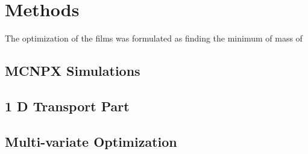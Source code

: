 \section{Methods}
\label{sec:Methodes}


The optimization of the films was formulated as finding the minimum of mass of 
\subsection{MCNPX Simulations}
\label{sec:MCNPXMethods}

\subsection{1 D Transport Part}

\subsection{Multi-variate Optimization}
\label{sec:MVOptimization}
